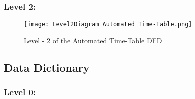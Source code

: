 \documentclass[a4paper,12pt]{article}
\begin{document}
\subsubsection{Level 2:}
\begin{figure}[H]
    \centering
    \texttt{[image: Level2Diagram Automated Time-Table.png]}
    \caption{Level - 2 of the Automated Time-Table DFD}
    \label{fig:placeholder}
\end{figure}



\newpage
\subsection{Data Dictionary}
\subsubsection{Level 0:}
\renewcommand{\arraystretch}{0.8}
\end{document}

